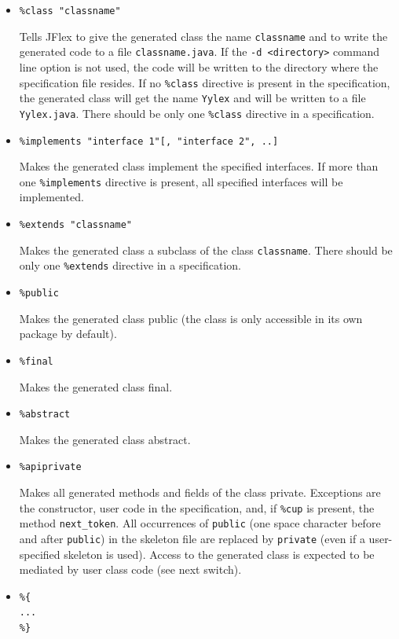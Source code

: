 \begin{itemize}
\item
  \texttt{\%class\ "classname"}

  Tells JFlex to give the generated class the name \texttt{classname}
  and to write the generated code to a file \texttt{classname.java}. If
  the \texttt{-d\ \textless{}directory\textgreater{}} command line
  option is not used, the code will be written to the directory where
  the specification file resides. If no \texttt{\%class} directive is
  present in the specification, the generated class will get the name
  \texttt{Yylex} and will be written to a file \texttt{Yylex.java}.
  There should be only one \texttt{\%class} directive in a
  specification.
\item
  \texttt{\%implements\ "interface\ 1"{[},\ "interface\ 2",\ ..{]}}

  Makes the generated class implement the specified interfaces. If more
  than one \texttt{\%implements} directive is present, all specified
  interfaces will be implemented.
\item
  \texttt{\%extends\ "classname"}

  Makes the generated class a subclass of the class \texttt{classname}.
  There should be only one \texttt{\%extends} directive in a
  specification.
\item
  \texttt{\%public}

  Makes the generated class public (the class is only accessible in its
  own package by default).
\item
  \texttt{\%final}

  Makes the generated class final.
\item
  \texttt{\%abstract}

  Makes the generated class abstract.
\item
  \texttt{\%apiprivate}

  Makes all generated methods and fields of the class private.
  Exceptions are the constructor, user code in the specification, and,
  if \texttt{\%cup} is present, the method \texttt{next\_token}. All
  occurrences of \texttt{public} (one space character before and after
  \texttt{public}) in the skeleton file are replaced by \texttt{private}
  (even if a user-specified skeleton is used). Access to the generated
  class is expected to be mediated by user class code (see next switch).
\item
  \texttt{\%\{}\\\texttt{...}\\\texttt{\%\}}


\end{itemize}
